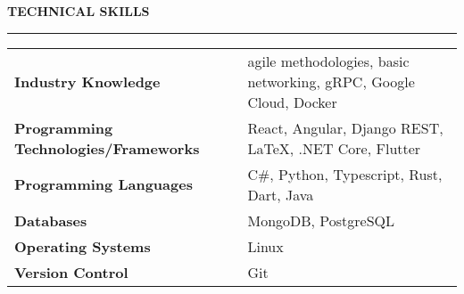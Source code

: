 \noindent\textcolor{themecolor}{\textbf{TECHNICAL SKILLS}}

\vspace{2mm}
\hrule

\begin{table}[h]
\begin{tabular}{ >{\bfseries} l l }
    Industry Knowledge & agile methodologies, basic networking, gRPC, Google Cloud, Docker \\
    Programming Technologies/Frameworks & React, Angular, Django REST, \LaTeX, .NET Core, Flutter\\
    Programming Languages & C\#, Python, Typescript, Rust, Dart, Java\\
    Databases & MongoDB, PostgreSQL\\
    Operating Systems & Linux\\
    Version Control & Git
\end{tabular}
\end{table}